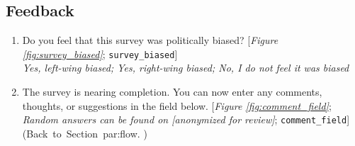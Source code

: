  \subsection*{Feedback} 
 \begin{enumerate}[resume] 
\item  \label{q:survey_biased} Do you feel that this survey was politically biased? [\textit{Figure \ref{fig:survey_biased}}; 
\verb|survey_biased|]
  \\ \textit{Yes, left-wing biased; Yes, right-wing biased; No, I do not feel it was biased}

\item  \label{q:comment_field} The survey is nearing completion. You can now enter any comments, thoughts, or suggestions in the field below. [\textit{Figure \ref{fig:comment_field}}; \textit{Random answers can be found on [anonymized for review]}; %
\verb|comment_field|] \hfill (Back~to~Section~{par:flow}.%
 )



 \end{enumerate} 

